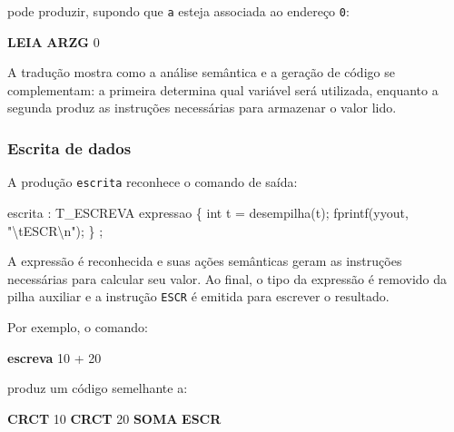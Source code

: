\documentclass[
  brazilian,
  letterpaper,
]{book}
\newenvironment{Shaded}{\begin{snugshade}}{\end{snugshade}}
\newcommand{\CharTok}[1]{\textcolor[rgb]{0.13,0.47,0.30}{#1}}
\newcommand{\DataTypeTok}[1]{\textcolor[rgb]{0.68,0.00,0.00}{#1}}
\newcommand{\DecValTok}[1]{\textcolor[rgb]{0.68,0.00,0.00}{#1}}
\newcommand{\KeywordTok}[1]{\textcolor[rgb]{0.00,0.23,0.31}{\textbf{#1}}}
\newcommand{\NormalTok}[1]{\textcolor[rgb]{0.00,0.23,0.31}{#1}}
\newcommand{\OperatorTok}[1]{\textcolor[rgb]{0.37,0.37,0.37}{#1}}
\newcommand{\SpecialCharTok}[1]{\textcolor[rgb]{0.37,0.37,0.37}{#1}}
\newcommand{\StringTok}[1]{\textcolor[rgb]{0.13,0.47,0.30}{#1}}
\theoremstyle{plain}
\theoremstyle{definition}
\theoremstyle{remark}
\begin{document}
pode produzir, supondo que \texttt{a} esteja associada ao endereço
\texttt{0}:

\begin{Shaded}
\begin{Highlighting}[]
     \KeywordTok{LEIA}
     \KeywordTok{ARZG}    \DecValTok{0}
\end{Highlighting}
\end{Shaded}

A tradução mostra como a análise semântica e a geração de código se
complementam: a primeira determina qual variável será utilizada,
enquanto a segunda produz as instruções necessárias para armazenar o
valor lido.

\subsubsection{Escrita de dados}\label{escrita-de-dados}

A produção \texttt{escrita} reconhece o comando de saída:

\begin{Shaded}
\begin{Highlighting}[]
\NormalTok{escrita}
    \OperatorTok{:}\NormalTok{ T\_ESCREVA expressao}
       \OperatorTok{\{}
        \DataTypeTok{int}\NormalTok{ t }\OperatorTok{=}\NormalTok{ desempilha}\OperatorTok{(}\CharTok{\textquotesingle{}t\textquotesingle{}}\OperatorTok{);} 
\NormalTok{        fprintf}\OperatorTok{(}\NormalTok{yyout}\OperatorTok{,} \StringTok{"}\SpecialCharTok{\textbackslash{}t}\StringTok{ESCR}\SpecialCharTok{\textbackslash{}n}\StringTok{"}\OperatorTok{);} 
       \OperatorTok{\}}
    \OperatorTok{;}
\end{Highlighting}
\end{Shaded}

A expressão é reconhecida e suas ações semânticas geram as instruções
necessárias para calcular seu valor. Ao final, o tipo da expressão é
removido da pilha auxiliar e a instrução \texttt{ESCR} é emitida para
escrever o resultado.

Por exemplo, o comando:

\begin{Shaded}
\begin{Highlighting}[]
\KeywordTok{escreva} \DecValTok{10}\NormalTok{ + }\DecValTok{20}
\end{Highlighting}
\end{Shaded}

produz um código semelhante a:

\begin{Shaded}
\begin{Highlighting}[]
     \KeywordTok{CRCT}    \DecValTok{10}
     \KeywordTok{CRCT}    \DecValTok{20}
     \KeywordTok{SOMA}
     \KeywordTok{ESCR}
\end{Highlighting}
\end{Shaded}
\end{document}
